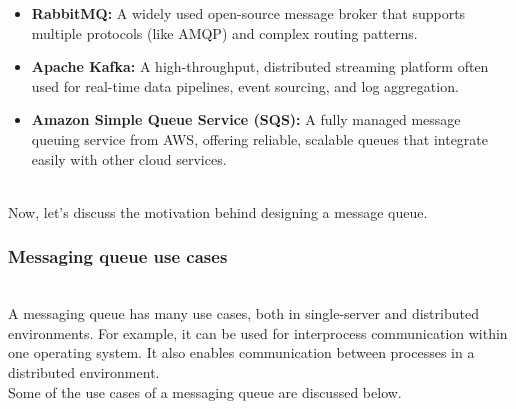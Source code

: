 \begin{itemize}
\item
\protect{}\label{aCyoH-TEOzqxrT6MqqMq-}
\textbf{RabbitMQ:} A widely used open-source message broker that supports multiple protocols (like AMQP) and complex routing patterns.
\item
\protect{}\label{MqUHwoOV4UQg5wq3fX5cl}
\textbf{Apache Kafka:} A high-throughput, distributed streaming platform often used for real-time data pipelines, event sourcing, and log aggregation.
\item
\protect{}\label{yK85AWqKVhCc6OxkJkSmN}
\textbf{Amazon Simple Queue Service (SQS):} A fully managed message queuing service from AWS, offering reliable, scalable queues that integrate easily with other cloud services.
\end{itemize}
\\
Now, let's discuss the motivation behind designing a message queue.

\subsubsection{Messaging queue use cases}\label{lKLj3OwOmyPl8lbRWvvAo}
\\
A messaging queue has many use cases, both in single-server and distributed environments. For example, it can be used for interprocess communication within one operating system. It also enables communication between processes in a distributed environment.
\\
Some of the use cases of a messaging queue are discussed below.


